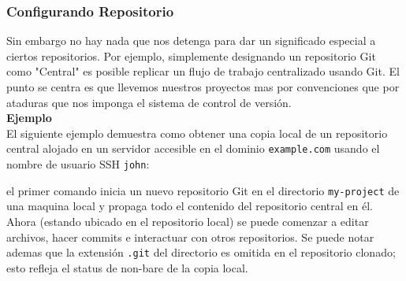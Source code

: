 \documentclass[8pt]{beamer}
\begin{document}
\begin{frame}
\begin{figure}
\end{figure}

\end{frame}


\begin{frame}
\frametitle{Configurando Repositorio}
Sin embargo no hay nada que nos detenga para dar un significado especial a ciertos repositorios. Por ejemplo, simplemente designando un repositorio Git como "Central" es posible replicar un flujo de trabajo centralizado usando Git. El punto se centra es que llevemos nuestros proyectos mas por convenciones que por ataduras que nos imponga el sistema de control de versi\'on.\\
\medskip
\textbf{Ejemplo}\\
\medskip
El siguiente ejemplo demuestra como obtener una copia local de un repositorio central alojado en un servidor accesible en el dominio \texttt{example.com} usando el nombre de usuario SSH \texttt{john}:


el primer comando inicia un nuevo repositorio Git en el directorio \texttt{my-project} de una maquina local y propaga todo el contenido del repositorio central en \'el. Ahora (estando ubicado en el repositorio local) se puede comenzar a editar archivos, hacer commits e interactuar con otros repositorios. Se puede notar ademas que la extensi\'on \texttt{.git} del directorio es omitida en el repositorio clonado; esto refleja el status de non-bare de la copia local.
\end{frame}
\end{document}
